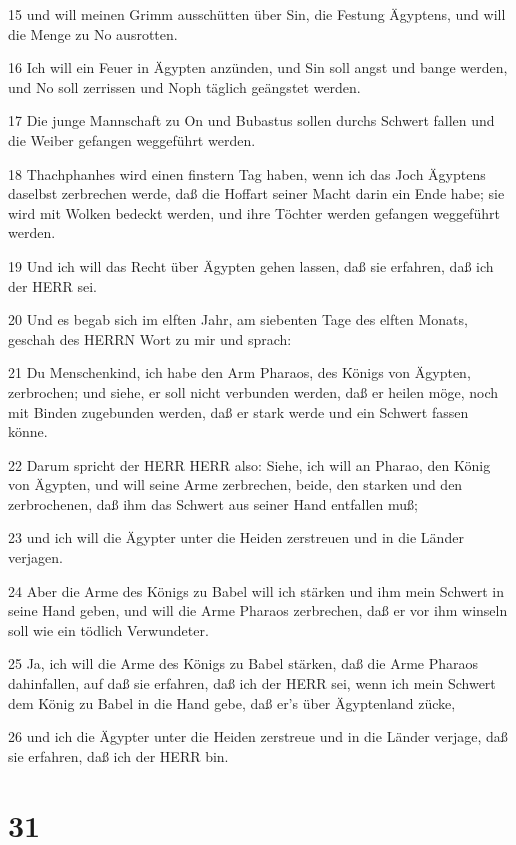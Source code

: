 \par 15 und will meinen Grimm ausschütten über Sin, die Festung Ägyptens, und will die Menge zu No ausrotten.
\par 16 Ich will ein Feuer in Ägypten anzünden, und Sin soll angst und bange werden, und No soll zerrissen und Noph täglich geängstet werden.
\par 17 Die junge Mannschaft zu On und Bubastus sollen durchs Schwert fallen und die Weiber gefangen weggeführt werden.
\par 18 Thachphanhes wird einen finstern Tag haben, wenn ich das Joch Ägyptens daselbst zerbrechen werde, daß die Hoffart seiner Macht darin ein Ende habe; sie wird mit Wolken bedeckt werden, und ihre Töchter werden gefangen weggeführt werden.
\par 19 Und ich will das Recht über Ägypten gehen lassen, daß sie erfahren, daß ich der HERR sei.
\par 20 Und es begab sich im elften Jahr, am siebenten Tage des elften Monats, geschah des HERRN Wort zu mir und sprach:
\par 21 Du Menschenkind, ich habe den Arm Pharaos, des Königs von Ägypten, zerbrochen; und siehe, er soll nicht verbunden werden, daß er heilen möge, noch mit Binden zugebunden werden, daß er stark werde und ein Schwert fassen könne.
\par 22 Darum spricht der HERR HERR also: Siehe, ich will an Pharao, den König von Ägypten, und will seine Arme zerbrechen, beide, den starken und den zerbrochenen, daß ihm das Schwert aus seiner Hand entfallen muß;
\par 23 und ich will die Ägypter unter die Heiden zerstreuen und in die Länder verjagen.
\par 24 Aber die Arme des Königs zu Babel will ich stärken und ihm mein Schwert in seine Hand geben, und will die Arme Pharaos zerbrechen, daß er vor ihm winseln soll wie ein tödlich Verwundeter.
\par 25 Ja, ich will die Arme des Königs zu Babel stärken, daß die Arme Pharaos dahinfallen, auf daß sie erfahren, daß ich der HERR sei, wenn ich mein Schwert dem König zu Babel in die Hand gebe, daß er's über Ägyptenland zücke,
\par 26 und ich die Ägypter unter die Heiden zerstreue und in die Länder verjage, daß sie erfahren, daß ich der HERR bin.

\chapter{31}

